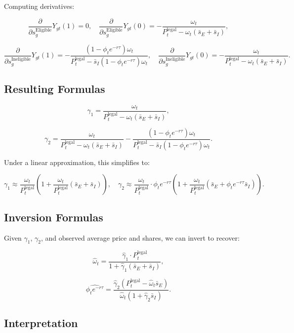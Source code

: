 \documentclass[12pt]{article}
\begin{document}
Computing derivatives:

\[
\frac{\partial}{\partial s_g^{\text{Eligible}}} Y_{gt}(1) = 0,
\quad
\frac{\partial}{\partial s_g^{\text{Eligible}}} Y_{gt}(0) = - \frac{\omega_t}{P_t^{\text{legal}} - \omega_t(\bar{s}_E + \bar{s}_I)},
\]

\[
\frac{\partial}{\partial s_g^{\text{Ineligible}}} Y_{gt}(1) = - \frac{(1 - \phi_t e^{-r\tau}) \omega_t}{P_t^{\text{legal}} - \bar{s}_I (1 - \phi_t e^{-r\tau}) \omega_t},
\quad
\frac{\partial}{\partial s_g^{\text{Ineligible}}} Y_{gt}(0) = - \frac{\omega_t}{P_t^{\text{legal}} - \omega_t(\bar{s}_E + \bar{s}_I)}.
\]

\subsection*{Resulting Formulas}

\[
\gamma_1 = \frac{\omega_t}{P_t^{\text{legal}} - \omega_t(\bar{s}_E + \bar{s}_I)},
\]

\[
\gamma_2 = 
\frac{\omega_t}{P_t^{\text{legal}} - \omega_t(\bar{s}_E + \bar{s}_I)}
- \frac{(1 - \phi_t e^{-r\tau}) \omega_t}{P_t^{\text{legal}} - \bar{s}_I (1 - \phi_t e^{-r\tau}) \omega_t}.
\]

Under a linear approximation, this simplifies to:

\[
\gamma_1 \approx \frac{\omega_t}{P_t^{\text{legal}}} \left( 1 + \frac{\omega_t}{P_t^{\text{legal}}} (\bar{s}_E + \bar{s}_I) \right),
\quad
\gamma_2 \approx \frac{\omega_t}{P_t^{\text{legal}}} \cdot \phi_t e^{-r\tau} \left( 1 + \frac{\omega_t}{P_t^{\text{legal}}} (\bar{s}_E + \phi_t e^{-r\tau} \bar{s}_I) \right).
\]

\subsection*{Inversion Formulas}

Given $\gamma_1$, $\gamma_2$, and observed average price and shares, we can invert to recover:

\[
\hat{\omega}_t = \frac{ \hat{\gamma}_1 \cdot P_t^{\text{legal}} }{ 1 + \hat{\gamma}_1 (\bar{s}_E + \bar{s}_I) },
\]

\[
\widehat{\phi_t e^{-r\tau}} = \frac{ \hat{\gamma}_2 \left( P_t^{\text{legal}} - \hat{\omega}_t \bar{s}_E \right) }{ \hat{\omega}_t (1 + \hat{\gamma}_2 \bar{s}_I) }.
\]

\subsection*{Interpretation}
\end{document}
